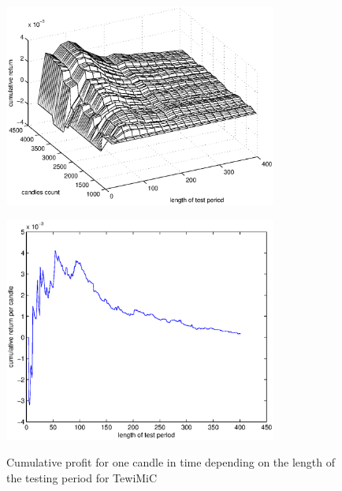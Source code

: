 \documentclass{tewiart}
\begin{document}
\begin{figure}[h!]
\centering
\begin{minipage}{.45\linewidth}
\begin{center}
\includegraphics[width=0.80\textwidth]{pictures/cumulativeReturnsPerCandleC.eps}
\label{Cum3DPerCMiC}
\end{center}
\end{minipage}
\begin{minipage}{.45\linewidth}
\begin{center}
\includegraphics[width=0.80\textwidth]{pictures/mic_percandle_end.eps}
\label{Cum3DPerCMiCend}
\end{center}
\end{minipage}
\caption{Cumulative profit for one candle in time depending on the length of the testing period for TewiMiC}
\end{figure}
\FloatBarrier
\end{document}
